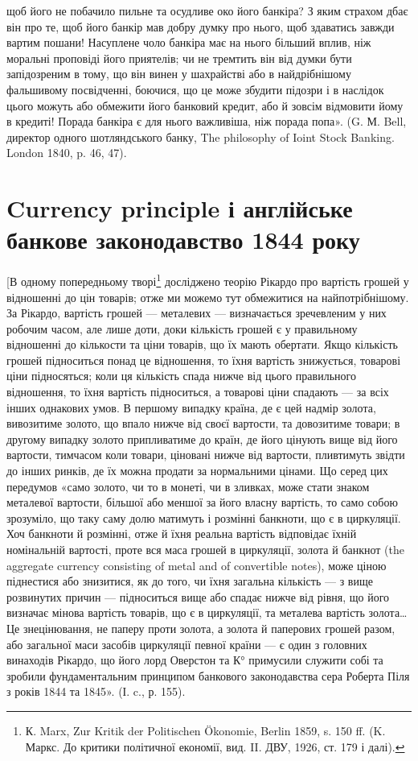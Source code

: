 \parcont{}  %
щоб його не побачило пильне та осудливе око його банкіра? З яким страхом
дбає він про те, щоб його банкір мав добру думку про нього, щоб здаватись
завжди вартим пошани! Насуплене чоло банкіра має на нього більший вплив,
ніж моральні проповіді його приятелів; чи не тремтить він від думки бути запідозреним
в тому, що він винен у шахрайстві або в найдрібнішому фальшивому
посвідченні, боючися, що це може збудити підозри і в наслідок цього можуть
або обмежити його банковий кредит, або й зовсім відмовити йому в кредиті!
Порада банкіра є для нього важливіша, ніж порада попа». (G. М. Bell, директор
одного шотляндського банку, The philosophy of Ioint Stock Banking. London 1840,
p. 46, 47).

\section{
Currency principle і англійське банкове законодавство
1844 року}

[В одному попередньому творі\footnote{
К. Marx, Zur Kritik der Politischen Ökonomie, Berlin 1859, s. 150 ff. (K. Маркс. До критики
політичної економії, вид. II. ДВУ, 1926, ст. 179 і далі).
} досліджено теорію Рікардо про вартість
грошей у відношенні до цін товарів; отже ми можемо тут обмежитися на найпотрібнішому.
За Рікардо, вартість грошей — металевих — визначається зречевленим
у них робочим часом, але лише доти, доки кількість грошей є у правильному
відношенні до кількости та ціни товарів, що їх мають обертати. Якщо
кількість грошей підноситься понад це відношення, то їхня вартість знижується,
товарові ціни підносяться; коли ця кількість спада нижче від цього правильного
відношення, то їхня вартість підноситься, а товарові ціни спадають — за всіх інших
однакових умов. В першому випадку країна, де є цей надмір золота,
вивозитиме золото, що впало нижче від своєї вартости, та довозитиме товари;
в другому випадку золото припливатиме до країн, де його цінують вище від його
вартости, тимчасом коли товари, ціновані нижче від вартости, пливтимуть звідти
до інших ринків, де їх можна продати за нормальними цінами. Що серед цих
передумов «само золото, чи то в монеті, чи в зливках, може стати знаком металевої
вартости, більшої або меншої за його власну вартість, то само собою
зрозуміло, що таку саму долю матимуть і розмінні банкноти, що є в циркуляції.
Хоч банкноти й розмінні, отже й їхня реальна вартість відповідає їхній номінальній
вартості, проте вся маса грошей в циркуляції, золота й банкнот (the
aggregate currency consisting of metal and of convertible notes), може ціною піднестися
або знизитися, як до того, чи їхня загальна кількість — з вище розвинутих
причин — підноситься вище або спадає нижче від рівня, що його визначає
мінова вартість товарів, що є в циркуляції, та металева вартість золота\dots{} Це
знецінювання, не паперу проти золота, а золота й паперових грошей разом, або
загальної маси засобів циркуляції певної країни — є один з головних винаходів
Рікардо, що його лорд Оверстон та К° примусили служити собі та зробили фундаментальним
принципом банкового законодавства сера Роберта Піля з років
1844 та 1845». (І. c., р. 155).

